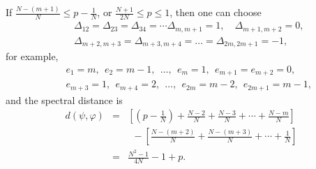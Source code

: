 \documentclass[a4paper,11pt]{article}
\begin{document}
If $\frac{N - (m + 1)}{N} \leqslant p - \frac{1}{N}$, or $\frac{N + 1}{2 N}
\leqslant p \leqslant 1$, then one can choose
\begin{eqnarray}
&&\Delta_{12} = \Delta_{23} = \Delta_{34} = \cdots \Delta_{m, m + 1} =
   1, \quad \Delta_{m + 1, m + 2} = 0, 
\nonumber\\
    &&\Delta_{m + 2, m
   + 3} = \Delta_{m + 3, m + 4} = \ldots = \Delta_{2 m, 2 m + 1} = -
   1,
\end{eqnarray}
for example,
\begin{eqnarray}
&&  e_1 = m,~~ e_2 = m-1,~~ \ldots,~~ e_m =
  1,~~ e_{m + 1} = e_{m + 2} = 0,
\nonumber\\
    &&
  e_{m + 3} = 1,~~ e_{m + 4} = 2,~~ \ldots, ~~e_{2
  m} = m - 2,~~ e_{2 m + 1} = m - 1,
\end{eqnarray}
and the spectral distance is
\begin{eqnarray}
  d (\psi, \varphi) & = & \left[ \left( p -
  \frac{1}{N} \right) + \frac{N - 2}{N} + \frac{N - 3}{N} + \cdots + \frac{N -
  m}{N} \right]\nonumber\\
    &&~~ - \left[ \frac{N - (m + 2)}{N} + \frac{N - (m + 3)}{N} +
  \cdots + \frac{1}{N}  \right]\nonumber\\
  & = & \frac{N^2 - 1}{4 N} - 1 + p .
\end{eqnarray}
\end{document}
